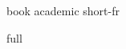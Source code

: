%
%
\ifdefined\ThesisTarget\else{}\fi

\newif\ifThesisArtCover        %
\newif\ifThesisOfficialCover   %
\newif\ifThesisFullBody        %
\newif\ifThesisAfive           %

\makeatletter
\def\Thesis@target@full{full}
\def\Thesis@target@book{book}
\def\Thesis@target@academic{academic}
\def\Thesis@target@shortfr{short-fr}

\ifx\ThesisTarget\Thesis@target@book
  \ThesisArtCovertrue  \ThesisOfficialCoverfalse \ThesisFullBodytrue  \ThesisAfivetrue
\else\ifx\ThesisTarget\Thesis@target@academic
  \ThesisArtCoverfalse \ThesisOfficialCovertrue  \ThesisFullBodytrue  \ThesisAfivefalse
\else\ifx\ThesisTarget\Thesis@target@shortfr
  \ThesisArtCovertrue  \ThesisOfficialCoverfalse \ThesisFullBodyfalse \ThesisAfivefalse
\else
  \ThesisArtCovertrue  \ThesisOfficialCovertrue  \ThesisFullBodytrue  \ThesisAfivefalse
\fi\fi\fi

\ifx\ThesisTarget\Thesis@target@full
  \newcommand{\ThesisAuxDir}{build}
\else
  \newcommand{\ThesisAuxDir}{build/\ThesisTarget}
\fi
\makeatother

